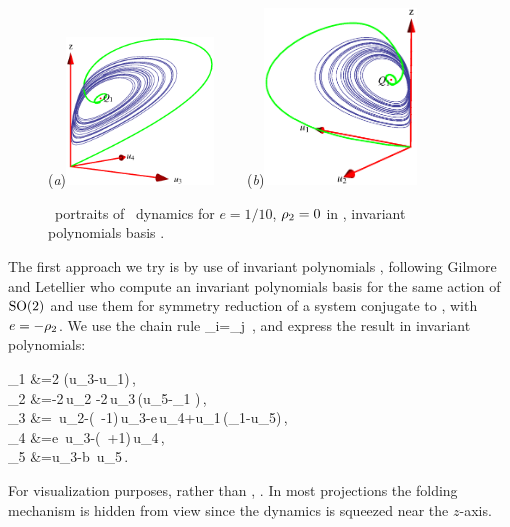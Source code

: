 \begin{figure}[ht]
\begin{center}
  (\textit{a})\includegraphics[width=0.35\textwidth]{../figs/CLEip1}
~~~~(\textit{b})\includegraphics[width=0.36\textwidth]{../figs/CLEip2}
\end{center}
\caption[Orbit space projection of Complex Lorenz flow:
Invariant polynomials basis]{ \Statesp\ portraits of \CLe\
dynamics for $e=1/10$, $\rho_2=0$ in \reducedsp,
invariant polynomials basis .
    }
\label{fig:CLEip}
\end{figure}

The first approach we try is by use of invariant polynomials
, following Gilmore and
Letellier who compute an invariant polynomials
basis for the same action of $\textrm{SO}(2)$ and use them for
symmetry reduction of a system conjugate to \CLe, with
$e=-\rho_2$.
We use the chain rule
\beq
 _i=_j
 \,,
and express the result in invariant polynomials:
\beq
\begin{split}
_1 &=2\,\sigma\,(u_3-u_1)\,,\\
_2 &=-2\,u_2 -2\,u_3\,(u_5-\rho_1 )\,,\\
_3 &=\sigma\,  u_2-(\sigma\,  -1)\,u_3-e\,u_4+u_1\,(\rho_1-u_5)\,,\\
_4 &=e\, u_3-(\sigma\, +1)\,u_4\,,\\
\dot{u}_5 &=u_3-b\, u_5\,.
\end{split}
\label{eq:CLEip}
\eeq
For visualization purposes, rather than , . In most projections the folding
mechanism is hidden from view since the dynamics is squeezed
near the $z$-axis.

